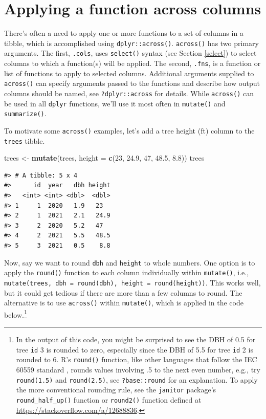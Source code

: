 \documentclass[
  11pt,
]{krantz}
\newenvironment{Shaded}{\begin{snugshade}}{\end{snugshade}}
\newcommand{\DataTypeTok}[1]{\textcolor[rgb]{0.13,0.29,0.53}{#1}}
\newcommand{\DecValTok}[1]{\textcolor[rgb]{0.00,0.00,0.81}{#1}}
\newcommand{\FloatTok}[1]{\textcolor[rgb]{0.00,0.00,0.81}{#1}}
\newcommand{\KeywordTok}[1]{\textcolor[rgb]{0.13,0.29,0.53}{\textbf{#1}}}
\newcommand{\NormalTok}[1]{#1}
\newcommand{\StringTok}[1]{\textcolor[rgb]{0.31,0.60,0.02}{#1}}
\theoremstyle{definition}
\theoremstyle{definition}
\theoremstyle{definition}
\theoremstyle{definition}
\theoremstyle{remark}
\begin{document}
\hypertarget{across}{%
\section{Applying a function across columns}\label{across}}

There's often a need to apply one or more functions to a set of columns in a tibble, which is accomplished using \texttt{dplyr::across()}. \texttt{across()} has two primary arguments. The first, \texttt{.cols}, uses \texttt{select()} syntax (see Section \ref{select}) to select columns to which a function(s) will be applied. The second, \texttt{.fns}, is a function or list of functions to apply to selected columns. Additional arguments supplied to \texttt{across()} can specify arguments passed to the functions and describe how output columns should be named, see \texttt{?dplyr::across} for details. While \texttt{across()} can be used in all \texttt{dplyr} functions, we'll use it most often in \texttt{mutate()} and \texttt{summarize()}.

To motivate some \texttt{across()} examples, let's add a tree height (ft) column to the \texttt{trees} tibble.

\begin{Shaded}
\begin{Highlighting}[]
\NormalTok{trees \textless{}{-}}\StringTok{ }\KeywordTok{mutate}\NormalTok{(trees, }\DataTypeTok{height =} \KeywordTok{c}\NormalTok{(}\DecValTok{23}\NormalTok{, }\FloatTok{24.9}\NormalTok{, }\DecValTok{47}\NormalTok{, }\FloatTok{48.5}\NormalTok{, }\FloatTok{8.8}\NormalTok{))}
\NormalTok{trees}
\end{Highlighting}
\end{Shaded}

\begin{verbatim}
#> # A tibble: 5 x 4
#>      id  year   dbh height
#>   <int> <int> <dbl>  <dbl>
#> 1     1  2020   1.9   23  
#> 2     1  2021   2.1   24.9
#> 3     2  2020   5.2   47  
#> 4     2  2021   5.5   48.5
#> 5     3  2021   0.5    8.8
\end{verbatim}

Now, say we want to round \texttt{dbh} and \texttt{height} to whole numbers. One option is to apply the \texttt{round()} function to each column individually within \texttt{mutate()}, i.e., \texttt{mutate(trees,\ dbh\ =\ round(dbh),\ height\ =\ round(height))}. This works well, but it could get tedious if there are more than a few columns to round. The alternative is to use \texttt{across()} within \texttt{mutate()}, which is applied in the code below.\footnote{In the output of this code, you might be surprised to see the DBH of 0.5 for tree \texttt{id} 3 is rounded to zero, especially since the DBH of 5.5 for tree \texttt{id} 2 is rounded to 6. R's \texttt{round()} function, like other languages that follow the IEC 60559 standard \citep{IEEE754}, rounds values involving .5 to the next even number, e.g., try \texttt{round(1.5)} and \texttt{round(2.5)}, see \texttt{?base::round} for an explanation. To apply the more conventional rounding rule, see the \texttt{janitor} package's \texttt{round\_half\_up()} function or \texttt{round2()} function defined at \url{https://stackoverflow.com/a/12688836}.}
\end{document}
